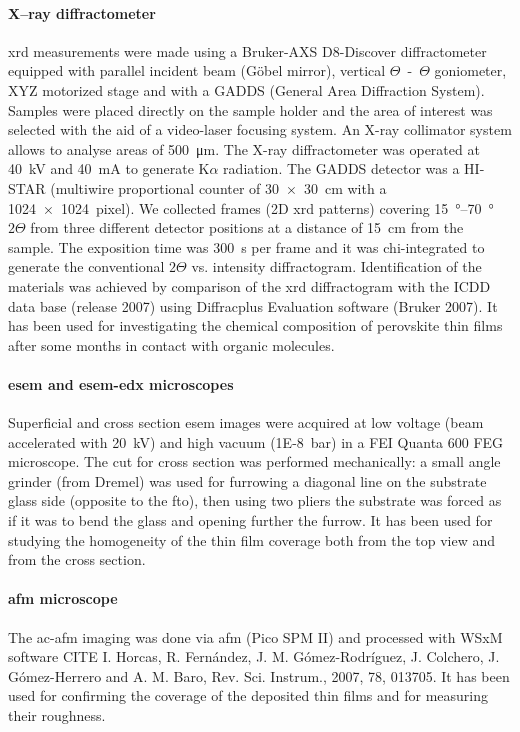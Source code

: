 \paragraph{X--ray diffractometer} \gls{xrd} measurements were made using a Bruker-AXS D8-Discover diffractometer equipped with parallel incident beam (Göbel mirror), vertical $\Theta$~-~$\Theta$ goniometer, XYZ motorized stage and with a GADDS (General Area Diffraction System). Samples were placed directly on the sample holder and the area of interest was selected with the aid of a video-laser focusing  system. An X-ray collimator system allows to analyse areas of \SI{500}{\um}. The X-ray diffractometer was operated at \SI{40}{\kV} and \SI{40}{\mA} to generate  K$\alpha$ radiation. The GADDS detector was a HI-STAR (multiwire proportional counter of \SI{30x30}{\cm} with a \SI{1024x1024}{pixel}). We collected frames (2D \gls{xrd} patterns) covering \SIrange{15}{70}{\degree} $2\Theta$ from three different detector positions at a distance of \SI{15}{\cm} from the sample. The exposition time was \SI{300}{\s} per frame and it was chi-integrated to generate the conventional $2\Theta$ vs. intensity diffractogram. Identification of the materials was achieved by comparison of the \gls{xrd} diffractogram with the ICDD data base (release 2007) using Diffracplus Evaluation software (Bruker 2007).
It has been used for investigating the chemical composition of perovskite thin films after some months in contact with organic molecules.

\paragraph{\Acrshort{esem} and \acrshort{esem}-\acrshort{edx} microscopes} Superficial and cross section \gls{esem} images were acquired at low voltage (beam accelerated with \SI{20}{\kV}) and high vacuum (\SI{1E-8}{\bar}) in a FEI Quanta 600 FEG microscope. The cut for cross section was performed mechanically: a small angle grinder (from Dremel) was used for furrowing a diagonal line on the substrate glass side (opposite to the \gls{fto}), then using two pliers the substrate was forced as if it was to bend the glass and opening further the furrow.
It has been used for studying the homogeneity of the thin film coverage both from the top view and from the cross section.

\paragraph{\Acrshort{afm} microscope} The \acrfull{ac-afm} imaging was done via \gls{afm} (Pico SPM II) and processed with WSxM software CITE I. Horcas, R. Fernández, J. M. Gómez-Rodríguez, J. Colchero, J. Gómez-Herrero and A. M. Baro, Rev. Sci. Instrum., 2007, 78, 013705.
It has been used for confirming the coverage of the deposited thin films and for measuring their roughness.

